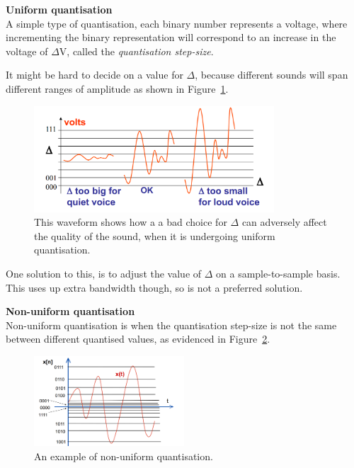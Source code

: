 \begin{description}
  \item \textbf{Uniform quantisation}\\
  \label{uniform-quantisation}
  A simple type of quantisation, each binary number represents a voltage, where 
  incrementing the binary representation will correspond to an increase in the 
  voltage of $\Delta\si{\volt}$, called the \textit{quantisation step-size}.

  It might be hard to decide on a value for $\Delta$, because different sounds
  will span different ranges of amplitude as shown in Figure~\ref{choosing-delta}.

  \begin{figure}
    \centering
    \includegraphics[width=0.8\textwidth]{images/choosing-delta}
    \caption{This waveform shows how a a bad choice for $\Delta$ can adversely
    affect the quality of the sound, when it is undergoing uniform quantisation.}
    \label{choosing-delta}
  \end{figure}

  One solution to this, is to adjust the value of $\Delta$ on a sample-to-sample
  basis. This uses up extra bandwidth though, so is not a preferred solution.

  \item \textbf{Non-uniform quantisation}\\
  \label{non-uniform-quantisation}
  Non-uniform quantisation is when the quantisation step-size is not the same
  between different quantised values, as evidenced in
  Figure~\ref{fig-non-uniform-quantisation}.

  \begin{figure}
    \centering
    \includegraphics[width=0.5\textwidth]{images/non-uniform-quantisation}
    \caption{An example of non-uniform quantisation.}
    \label{fig-non-uniform-quantisation}
  \end{figure}


\end{description}
